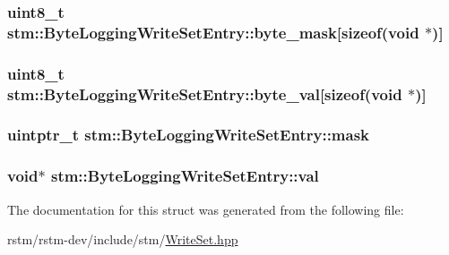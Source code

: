 \hypertarget{structstm_1_1ByteLoggingWriteSetEntry_a569ce98c81a55ed39f2408bce9734bbf}{
\subsubsection[{byte\-\_\-mask}]{\setlength{\rightskip}{0pt plus 5cm}uint8\-\_\-t stm\-::\-Byte\-Logging\-Write\-Set\-Entry\-::byte\-\_\-mask\mbox{[}sizeof(void $\ast$)\mbox{]}}}\label{structstm_1_1ByteLoggingWriteSetEntry_a569ce98c81a55ed39f2408bce9734bbf}
\hypertarget{structstm_1_1ByteLoggingWriteSetEntry_a40f023cbd1895383090a36aed674c991}{
\subsubsection[{byte\-\_\-val}]{\setlength{\rightskip}{0pt plus 5cm}uint8\-\_\-t stm\-::\-Byte\-Logging\-Write\-Set\-Entry\-::byte\-\_\-val\mbox{[}sizeof(void $\ast$)\mbox{]}}}\label{structstm_1_1ByteLoggingWriteSetEntry_a40f023cbd1895383090a36aed674c991}
\hypertarget{structstm_1_1ByteLoggingWriteSetEntry_a3bea52141880d7ff6f03c498ed7d0a47}{
\subsubsection[{mask}]{\setlength{\rightskip}{0pt plus 5cm}uintptr\-\_\-t stm\-::\-Byte\-Logging\-Write\-Set\-Entry\-::mask}}\label{structstm_1_1ByteLoggingWriteSetEntry_a3bea52141880d7ff6f03c498ed7d0a47}
\hypertarget{structstm_1_1ByteLoggingWriteSetEntry_ae5246177179e5ec224f6af8d123980c2}{
\subsubsection[{val}]{\setlength{\rightskip}{0pt plus 5cm}void$\ast$ stm\-::\-Byte\-Logging\-Write\-Set\-Entry\-::val}}\label{structstm_1_1ByteLoggingWriteSetEntry_ae5246177179e5ec224f6af8d123980c2}


The documentation for this struct was generated from the following file\-:\begin{DoxyCompactItemize}
\item 
rstm/rstm-\/dev/include/stm/\hyperlink{WriteSet_8hpp}{Write\-Set.\-hpp}\end{DoxyCompactItemize}

